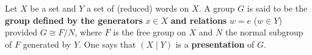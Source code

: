 \begin{definition}
Let $X$ be a set and $Y$ a set of (reduced) words on $X$. A group $G$ is said to be the \textbf{group defined by the generators} $x \in X$ \textbf{and relations} $w = e$ ($w \in Y$) provided $G \cong F/N$, where $F$ is the free group on $X$ and $N$ the normal subgroup of $F$ generated by $Y$. One says that $(X \mid Y)$ is a \textbf{presentation} of $G$.
\end{definition}
